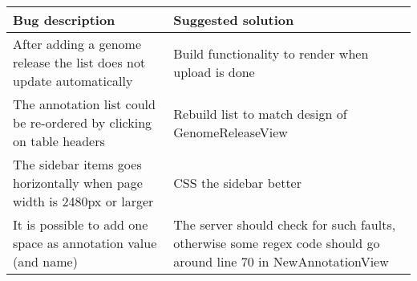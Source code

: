 \begin{tabular}{|p{5.5cm} | p{5.5cm}|}
	\hline
	\textbf{Bug description} & \textbf{Suggested solution} \\ \hline
	After adding a genome release the list does not update automatically & Build functionality to render when upload is done \\ \hline
	The annotation list could be re-ordered by clicking on table headers & Rebuild list to match design of GenomeReleaseView \\ \hline
	The sidebar items goes horizontally when page width is 2480px or larger & CSS the sidebar better \\ \hline
	It is possible to add one space as annotation value (and name) & The server should check for such faults, otherwise some regex code should go around line 70 in NewAnnotationView \\ \hline
\end{tabular}
